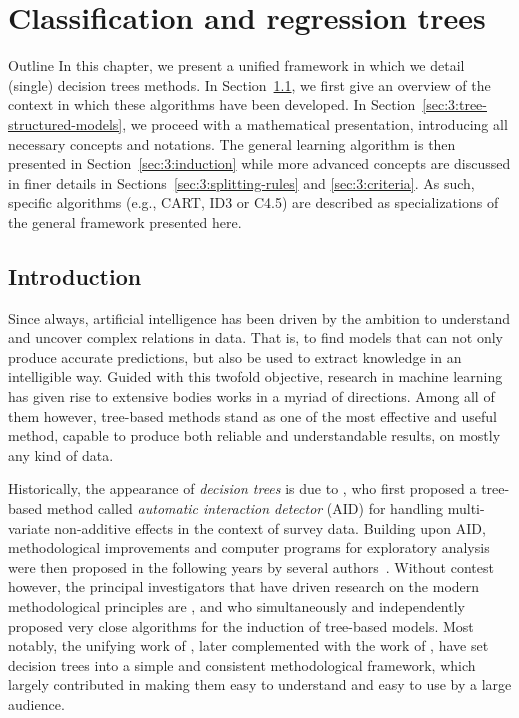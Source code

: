 \chapter{Classification and regression trees}\label{ch:cart}

\begin{remark}{Outline}
In this chapter, we present a unified framework in which we detail (single)
decision trees methods. In Section~\ref{sec:3:introduction}, we first give an
overview of the context in which these algorithms have been developed. In
Section~\ref{sec:3:tree-structured-models}, we proceed with a mathematical
presentation, introducing all necessary concepts and notations. The general
learning algorithm is then presented in Section~\ref{sec:3:induction} while
more advanced concepts are discussed in finer details in Sections~\ref{sec:3:splitting-rules}
and \ref{sec:3:criteria}. As such, specific algorithms (e.g.,
CART, ID3 or C4.5) are described as specializations of the general framework
presented here.
\end{remark}

\section{Introduction}
\label{sec:3:introduction}

Since always, artificial intelligence has been driven by the ambition to
understand and uncover complex relations in data. That is, to find models that
can not only produce accurate predictions, but also be used to extract
knowledge in an intelligible way. Guided with this twofold objective, research
in machine learning has given rise to extensive bodies works in a myriad of
directions. Among all of them however, tree-based methods stand as one of
the most effective and useful method, capable to produce both reliable and
understandable results, on mostly any kind of data.

Historically, the appearance of \textit{decision trees} is due to
\citet{morgan:1963}, who first proposed a tree-based method called
\textit{automatic interaction detector} (AID) for handling multi-variate
non-additive effects in the context of survey data. Building upon AID,
methodological improvements and computer programs for exploratory analysis were
then proposed in the following years by several
authors~\citep{sonquist:1970,messenger:1972,gillo:1972,sonquist:1974}. Without
contest however, the principal investigators that have driven research on the modern
methodological principles are \citet{breiman:1978a,breiman:1978b},
\citet{friedman:1977,friedman:1979} and \citet{quinlan:1979,quinlan:1986} who
simultaneously and independently proposed very close algorithms for the
induction of tree-based models. Most notably, the unifying work of
\citet{breiman:1984}, later complemented with the work of \citet{quinlan:1993},
have set decision trees into a simple and consistent methodological framework,
which largely contributed in making them easy to understand and easy to use by
a large audience.

